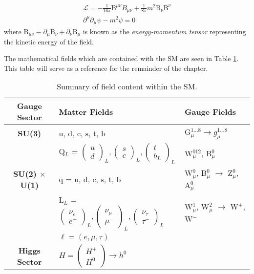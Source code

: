 \begin{equation}
\begin{array}{l}
\mathcal{L} = -\frac{1}{16\pi} \mathrm{B}^{\mu\nu}B_{\mu\nu} + \frac{1}{8\pi}m^{2}\mathrm{B}_{\nu}\mathrm{B}^{\nu}\\
\partial^{\mu} \partial_{\mu} \psi - m^{2} \psi = 0
\end{array}
\end{equation}
where $\mathrm{B}_{\mu\nu} \equiv \partial_{\mu}\mathrm{B}_{\nu} + \partial_{\nu}\mathrm{B}_{\mu}$ is known as the \textit{energy-momentum tensor} representing the kinetic energy of the field.

The mathematical fields which are contained with the SM are seen in Table \ref{tab:sm}. This table will serve as a reference for the remainder of the chapter.

\begin{table}
\caption{Summary of field content within the SM.}
\centering
\begin{tabular}{c|ll}
\hline\hline
Gauge Sector & Matter Fields & Gauge Fields \\
\hline
\textbf{SU(3)} & u, d, c, s, t, b & G$_{\mu}^{1...8} \rightarrow g_{\mu}^{1...8} $ \\
\hline
 & Q$_{L}$ = $\begin{pmatrix} u \\ d \end{pmatrix}_{L}, \begin{pmatrix} s \\ c \end{pmatrix}_{L}, \begin{pmatrix} t \\ b_{L} \end{pmatrix}_{L} $ & W$^{012}_{\mu}$, B$^{0}_{\mu}$ \\
\textbf{SU(2) $\times$ U(1)} & q = u, d, c, s, t, b & W$_{\mu}^{0}$, B$_{\mu}^{0}$ $\rightarrow$ Z$^{0}_{\mu}$, A$^{0}_{\mu}$\\
  & L$_{L}$ = $\begin{pmatrix} \nu_{e} \\ e^{-} \end{pmatrix}_{L} , \begin{pmatrix} \nu_{\mu} \\ \mu^{-} \end{pmatrix}_{L} , \begin{pmatrix} \nu_{\tau} \\ \tau^{-}\end{pmatrix}_{L} $ & W$^{1}_{\mu}$, W$^{2}_{\mu}$ $\rightarrow$ W$^{+}$, W$^{-}$\\
  & $\ell = (e, \mu, \tau)$ & \\
  \hline
\textbf{Higgs Sector} & $H = \begin{pmatrix} H^{+} \\ H^{0} \end{pmatrix} \rightarrow h^{0}$ & \\
  \hline\hline
\end{tabular}
\label{tab:sm}
\end{table}


